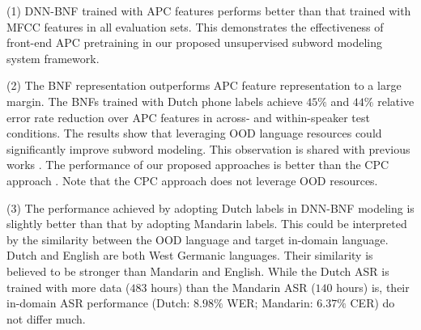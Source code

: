 \documentclass[a4paper]{article}
\begin{document}
(1) DNN-BNF trained with APC features performs better than that trained with MFCC features in all evaluation sets. This  demonstrates the effectiveness of front-end APC pretraining in our proposed unsupervised subword modeling system framework.

(2) The BNF representation outperforms APC feature representation to a large margin. The  BNFs trained with  Dutch phone labels  achieve $45\%$ and $44\%$ relative error rate reduction over APC features in across- and within-speaker test conditions. 
The results show that leveraging OOD language resources could significantly improve subword modeling. This observation is shared with previous works \cite{shibata2017composite,feng2019_TASLP}. The performance of our proposed approaches is better than the CPC approach  \cite{riviere2020unsupervised}. Note that the CPC approach does not leverage OOD resources.

(3) The performance achieved by adopting Dutch labels in DNN-BNF modeling is slightly better than that by adopting Mandarin labels. 
This could be interpreted by the similarity between the OOD language and target in-domain language. Dutch and English are both West Germanic languages. Their similarity is believed to be stronger than Mandarin and English. While the Dutch ASR  is trained with more data ($483$ hours) than the Mandarin ASR ($140$ hours) is, their in-domain ASR performance (Dutch: $8.98\%$ WER; Mandarin: $6.37\%$ CER) do not differ much. 






\end{document}
